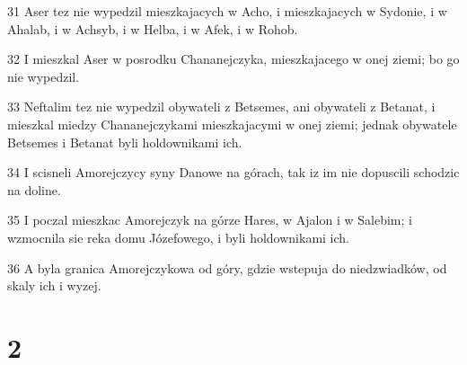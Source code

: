 \par 31 Aser tez nie wypedzil mieszkajacych w Acho, i mieszkajacych w Sydonie, i w Ahalab, i w Achsyb, i w Helba, i w Afek, i w Rohob.
\par 32 I mieszkal Aser w posrodku Chananejczyka, mieszkajacego w onej ziemi; bo go nie wypedzil.
\par 33 Neftalim tez nie wypedzil obywateli z Betsemes, ani obywateli z Betanat, i mieszkal miedzy Chananejczykami mieszkajacymi w onej ziemi; jednak obywatele Betsemes i Betanat byli holdownikami ich.
\par 34 I scisneli Amorejczycy syny Danowe na górach, tak iz im nie dopuscili schodzic na doline.
\par 35 I poczal mieszkac Amorejczyk na górze Hares, w Ajalon i w Salebim; i wzmocnila sie reka domu Józefowego, i byli holdownikami ich.
\par 36 A byla granica Amorejczykowa od góry, gdzie wstepuja do niedzwiadków, od skaly ich i wyzej.

\chapter{2}

